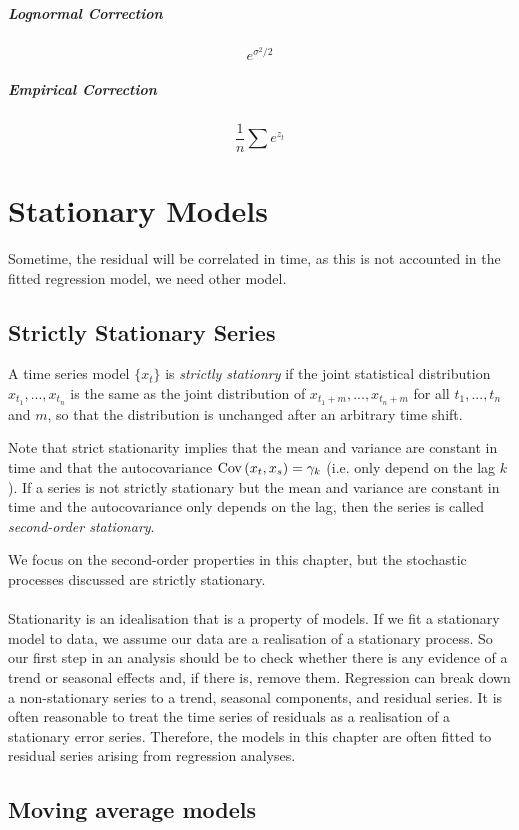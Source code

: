 \subparagraph{Lognormal Correction}
\[ e^{\sigma^2 /2} \]
\subparagraph{Empirical Correction}
\[ \frac{1}{n} \sum e^{z_t} \]

\section{Stationary Models}
Sometime, the residual will be correlated in time, as this is not accounted in the fitted regression model, we need other model. 

\subsection{Strictly Stationary Series}
A time series model $\{ x_t \}$ is \emph{strictly stationry} if the joint statistical distribution $x_{t_1},...,x_{t_n}$ is the same as the joint distribution of $x_{t_1 + m},...,x_{t_n + m}$ for all $t_1, ..., t_n$ and $m$, so that the distribution is unchanged after an arbitrary time shift.

\begin{note}
    Note that strict stationarity implies that the mean and variance are constant in time and that the autocovariance $ \mathrm{Cov} \left( x_t, x_s \right) = \gamma_k$ (i.e. only depend on the lag $k$). If a series is not strictly stationary but the mean and variance are constant in time and the autocovariance only depends on the lag, then the series is called \emph{second-order stationary}.
\end{note}
We focus on the second-order properties in this chapter, but the stochastic processes discussed are strictly stationary.
\\ 
\\
Stationarity is an idealisation that is a property of models. If we fit a stationary model to data, we assume our data are a realisation of a stationary process. So our first step in an analysis should be to check whether there is any evidence of a trend or seasonal effects and, if there is, remove them. Regression can break down a non-stationary series to a trend, seasonal components, and residual series. It is often reasonable to treat the time series of residuals as a realisation of a stationary error series. Therefore, the models in this chapter are often fitted to residual series arising from regression analyses.

\subsection{Moving average models}

